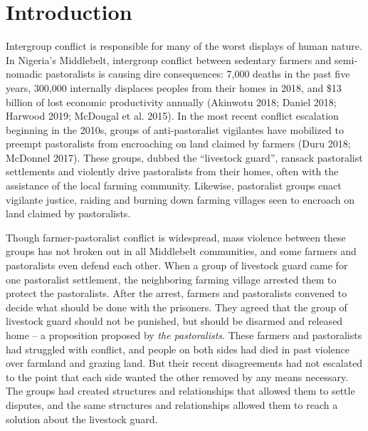 \documentclass[11pt]{article}
\begin{document}
\hypertarget{introduction}{%
\section{Introduction}\label{introduction}}

Intergroup conflict is responsible for many of the worst displays of
human nature. In Nigeria's Middlebelt, intergroup conflict between
sedentary farmers and semi-nomadic pastoralists is causing dire
consequences: 7,000 deaths in the past five years, 300,000 internally
displaces peoples from their homes in 2018, and \$13 billion of lost
economic productivity annually (Akinwotu 2018; Daniel 2018; Harwood
2019; McDougal et al. 2015). In the most recent conflict escalation
beginning in the 2010s, groups of anti-pastoralist vigilantes have
mobilized to preempt pastoralists from encroaching on land claimed by
farmers (Duru 2018; McDonnel 2017). These groups, dubbed the ``livestock
guard'', ransack pastoralist settlements and violently drive
pastoralists from their homes, often with the assistance of the local
farming community. Likewise, pastoralist groups enact vigilante justice,
raiding and burning down farming villages seen to encroach on land
claimed by pastoralists.

Though farmer-pastoralist conflict is widespread, mass violence between
these groups has not broken out in all Middlebelt communities, and some
farmers and pastoralists even defend each other. When a group of
livestock guard came for one pastoralist settlement, the neighboring
farming village arrested them to protect the pastoralists. After the
arrest, farmers and pastoralists convened to decide what should be done
with the prisoners. They agreed that the group of livestock guard should
not be punished, but should be disarmed and released home -- a
proposition proposed by \emph{the pastoralists}. These farmers and
pastoralists had struggled with conflict, and people on both sides had
died in past violence over farmland and grazing land. But their recent
disagreements had not escalated to the point that each side wanted the
other removed by any means necessary. The groups had created structures
and relationships that allowed them to settle disputes, and the same
structures and relationships allowed them to reach a solution about the
livestock guard.
\end{document}
